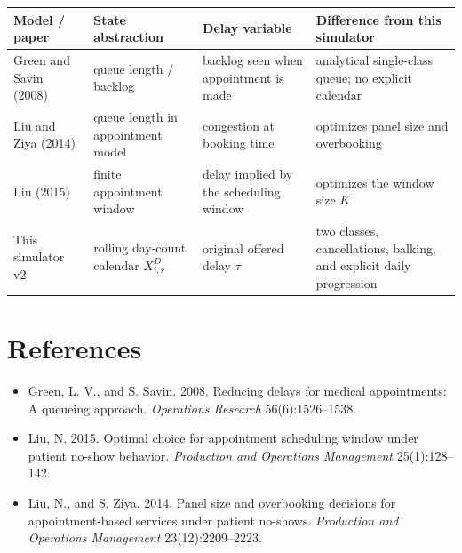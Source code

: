 \documentclass[11pt]{article}
\begin{document}
\begin{center}
\small
\begin{tabular}{L{0.18\textwidth} L{0.22\textwidth} L{0.22\textwidth} L{0.24\textwidth}}
\toprule
\textbf{Model / paper} & \textbf{State abstraction} & \textbf{Delay variable} & \textbf{Difference from this simulator} \\
\midrule
Green and Savin (2008) & queue length / backlog & backlog seen when appointment is made & analytical single-class queue; no explicit calendar \\
\addlinespace
Liu and Ziya (2014) & queue length in appointment model & congestion at booking time & optimizes panel size and overbooking \\
\addlinespace
Liu (2015) & finite appointment window & delay implied by the scheduling window & optimizes the window size \(K\) \\
\addlinespace
This simulator v2 & rolling day-count calendar \(X_{i,r}^{D}\) & original offered delay \(\tau\) & two classes, cancellations, balking, and explicit daily progression \\
\bottomrule
\end{tabular}
\normalsize
\end{center}

\section{References}

\begin{itemize}[itemsep=0.25em]
    \item Green, L. V., and S. Savin. 2008. Reducing delays for medical appointments: A queueing approach. \emph{Operations Research} 56(6):1526--1538.
    \item Liu, N. 2015. Optimal choice for appointment scheduling window under patient no-show behavior. \emph{Production and Operations Management} 25(1):128--142.
    \item Liu, N., and S. Ziya. 2014. Panel size and overbooking decisions for appointment-based services under patient no-shows. \emph{Production and Operations Management} 23(12):2209--2223.
\end{itemize}
\end{document}
